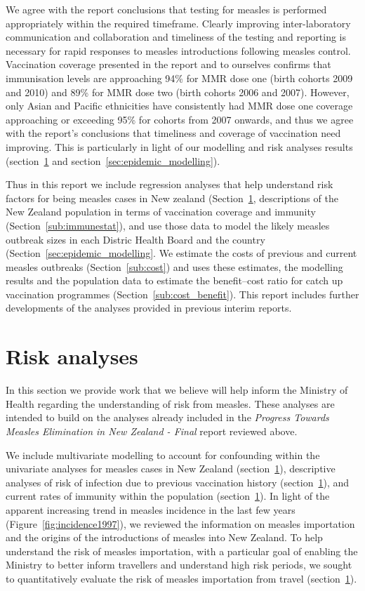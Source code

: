 \documentclass{article}
\begin{document}
\begin{itemize}
We agree with the report conclusions that testing for measles is performed appropriately within the required timeframe. Clearly improving inter-laboratory communication and collaboration and timeliness of the testing and reporting is necessary for rapid responses to measles introductions following measles control. Vaccination coverage presented in the report and to ourselves confirms that immunisation levels are approaching 94\% for MMR dose one (birth cohorts 2009 and 2010) and 89\% for MMR dose two (birth cohorts 2006 and 2007). However, only Asian and Pacific ethnicities have consistently had MMR dose one coverage approaching or exceeding 95\% for cohorts from 2007 onwards, and thus we agree with the report's conclusions that timeliness and coverage of vaccination need improving. This is particularly in light of our modelling and risk analyses results (section~\ref{sub:risk_analyses} and section~\ref{sec:epidemic_modelling}).

Thus in this report we include regression analyses that help understand risk factors for being measles cases in New zealand (Section~\ref{sub:risk_analyses}, descriptions of the New Zealand population in terms of vaccination coverage and immunity (Section~\ref{sub:immunestat}), and use those data to model the likely measles outbreak sizes in each Distric Health Board and the country (Section~\ref{sec:epidemic_modelling}. We estimate the costs of previous and current measles outbreaks (Section~\ref{sub:cost}) and uses these estimates, the modelling results and the population data to estimate the benefit--cost ratio for catch up vaccination programmes (Section~\ref{sub:cost_benefit}). This report includes further developments of the analyses provided in previous interim reports.

\section{Risk analyses}
\label{sub:risk_analyses}

In this section we provide work that we believe will help inform the Ministry of Health regarding the understanding of risk from measles. These analyses are intended to build on the analyses already included in the \emph {Progress Towards Measles Elimination in New Zealand - Final} report reviewed above.

We include multivariate modelling to account for confounding within the univariate analyses for measles cases in New Zealand (section~\ref{sub:risk_analyses}), descriptive analyses of risk of infection due to previous vaccination history (section~\ref{sub:risk_analyses}), and current rates of immunity within the population (section~\ref{sub:risk_analyses}). In light of the apparent increasing trend in measles incidence in the last few years (Figure~\ref{fig:incidence1997}), we reviewed the information on measles importation and the origins of the introductions of measles into New Zealand. To help understand the risk of measles importation, with a particular goal of enabling the Ministry to better inform travellers and understand high risk periods, we sought to quantitatively evaluate the risk of measles importation from travel (section~\ref{sub:risk_analyses}).


\end{itemize}
\end{document}

